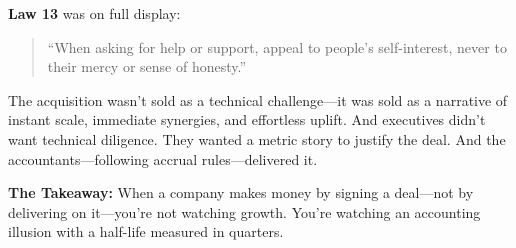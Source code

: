\medskip

\textbf{Law 13} was on full display:
\begin{quote}
“When asking for help or support, appeal to people’s self-interest, never to their mercy or sense of honesty.”
\end{quote}

The acquisition wasn’t sold as a technical challenge—it was sold as a narrative of instant scale, immediate synergies, and effortless uplift.  
And executives didn’t want technical diligence.  
They wanted a metric story to justify the deal.  
And the accountants—following accrual rules—delivered it.

\medskip

\textbf{The Takeaway:}  
When a company makes money by signing a deal—not by delivering on it—you’re not watching growth.  
You’re watching an accounting illusion with a half-life measured in quarters.
